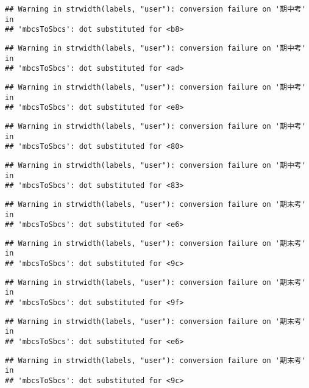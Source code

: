 \documentclass[
]{book}
\begin{document}
\begin{verbatim}
## Warning in strwidth(labels, "user"): conversion failure on '期中考' in
## 'mbcsToSbcs': dot substituted for <b8>
\end{verbatim}

\begin{verbatim}
## Warning in strwidth(labels, "user"): conversion failure on '期中考' in
## 'mbcsToSbcs': dot substituted for <ad>
\end{verbatim}

\begin{verbatim}
## Warning in strwidth(labels, "user"): conversion failure on '期中考' in
## 'mbcsToSbcs': dot substituted for <e8>
\end{verbatim}

\begin{verbatim}
## Warning in strwidth(labels, "user"): conversion failure on '期中考' in
## 'mbcsToSbcs': dot substituted for <80>
\end{verbatim}

\begin{verbatim}
## Warning in strwidth(labels, "user"): conversion failure on '期中考' in
## 'mbcsToSbcs': dot substituted for <83>
\end{verbatim}

\begin{verbatim}
## Warning in strwidth(labels, "user"): conversion failure on '期末考' in
## 'mbcsToSbcs': dot substituted for <e6>
\end{verbatim}

\begin{verbatim}
## Warning in strwidth(labels, "user"): conversion failure on '期末考' in
## 'mbcsToSbcs': dot substituted for <9c>
\end{verbatim}

\begin{verbatim}
## Warning in strwidth(labels, "user"): conversion failure on '期末考' in
## 'mbcsToSbcs': dot substituted for <9f>
\end{verbatim}

\begin{verbatim}
## Warning in strwidth(labels, "user"): conversion failure on '期末考' in
## 'mbcsToSbcs': dot substituted for <e6>
\end{verbatim}

\begin{verbatim}
## Warning in strwidth(labels, "user"): conversion failure on '期末考' in
## 'mbcsToSbcs': dot substituted for <9c>
\end{verbatim}
\end{document}
